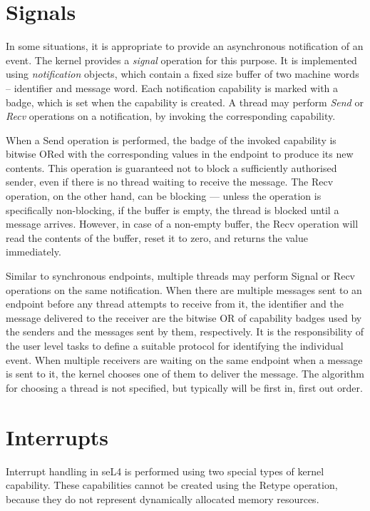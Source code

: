 \section{Signals}\label{sec:overview.signals}

In some situations, it is appropriate to provide an asynchronous notification
of an event. The kernel provides a \emph{signal} operation for this
purpose. It is implemented using \emph{notification} objects, which
contain a fixed size buffer of two machine words -- identifier and message word.
Each notification capability is marked with a badge, which is set when
the capability is created. A thread may perform \emph{Send} or \emph{Recv}
operations on a notification, by invoking the corresponding
capability.

When a Send operation is performed, the badge of the invoked capability is bitwise ORed with the corresponding values in the
endpoint to produce its new contents. This operation is guaranteed not to block
a sufficiently authorised sender, even if there is no thread waiting to receive
the message. The Recv operation, on the other hand, can be blocking --- unless the operation is specifically non-blocking, if the
buffer is empty, the thread is blocked until a message arrives. However, in
case of a non-empty buffer, the Recv operation will read the contents of the
buffer, reset it to zero, and returns the value immediately.

Similar to synchronous endpoints, multiple threads may perform Signal or Recv
operations on the same notification. When there are multiple messages
sent to an endpoint before any thread attempts to receive from it, the
identifier and the message delivered to the receiver are the bitwise OR of
capability badges used by the senders and the messages sent by them,
respectively. It is the responsibility of the user level tasks to define a
suitable protocol for identifying the individual event. When multiple receivers
are waiting on the same endpoint when a message is sent to it, the kernel
chooses one of them to deliver the message. The algorithm for choosing a thread
is not specified, but typically will be first in, first out order.

\section{Interrupts}\label{sec:overview.interrupts}

Interrupt handling in seL4 is performed using two special types of kernel
capability. These capabilities cannot be created using the Retype operation,
because they do not represent dynamically allocated memory resources.

